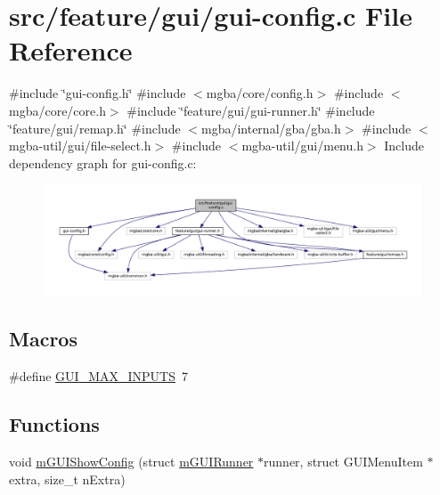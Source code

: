 \hypertarget{gui-config_8c}{}\section{src/feature/gui/gui-\/config.c File Reference}
\label{gui-config_8c}
{\ttfamily \#include \char`\"{}gui-\/config.\+h\char`\"{}}\newline
{\ttfamily \#include $<$mgba/core/config.\+h$>$}\newline
{\ttfamily \#include $<$mgba/core/core.\+h$>$}\newline
{\ttfamily \#include \char`\"{}feature/gui/gui-\/runner.\+h\char`\"{}}\newline
{\ttfamily \#include \char`\"{}feature/gui/remap.\+h\char`\"{}}\newline
{\ttfamily \#include $<$mgba/internal/gba/gba.\+h$>$}\newline
{\ttfamily \#include $<$mgba-\/util/gui/file-\/select.\+h$>$}\newline
{\ttfamily \#include $<$mgba-\/util/gui/menu.\+h$>$}\newline
Include dependency graph for gui-\/config.c\+:
\nopagebreak
\begin{figure}[H]
\begin{center}
\leavevmode
\includegraphics[width=350pt]{gui-config_8c__incl}
\end{center}
\end{figure}
\subsection*{Macros}
\begin{DoxyCompactItemize}
\item 
\#define \mbox{\hyperlink{gui-config_8c_a2858f21eacf145bc1d405daf6270f6e3}{G\+U\+I\+\_\+\+M\+A\+X\+\_\+\+I\+N\+P\+U\+TS}}~7
\end{DoxyCompactItemize}
\subsection*{Functions}
\begin{DoxyCompactItemize}
\item 
void \mbox{\hyperlink{gui-config_8c_a505ebe8c0708157c31aff0d023cb6631}{m\+G\+U\+I\+Show\+Config}} (struct \mbox{\hyperlink{structm_g_u_i_runner}{m\+G\+U\+I\+Runner}} $\ast$runner, struct G\+U\+I\+Menu\+Item $\ast$extra, size\+\_\+t n\+Extra)
\end{DoxyCompactItemize}


